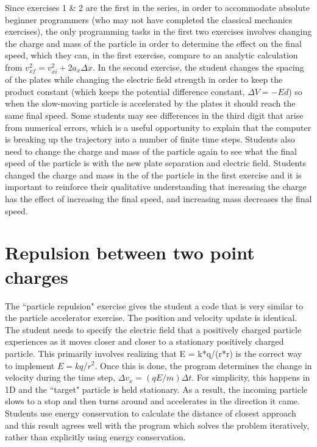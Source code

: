 \documentclass[aps,prd,10pt,twocolumn,showpacs,preprintnumbers,amsmath,amssymb,nofootinbib,floatfix]{revtex4-1}
\begin{document}
Since exercises 1 \& 2 are the first in the series, in order to accommodate absolute beginner programmers (who may not have completed the classical mechanics exercises), the only programming tasks in the first two exercises involves changing the charge and mass of the particle in order to determine the effect on the final speed, which they can, in the first exercise, compare to an analytic calculation from $v_{xf}^2 = v_{xi}^2 + 2 a_x \Delta x$. In the second exercise, the student changes the spacing of the plates while changing the electric field strength in order to keep the product constant (which keeps the potential difference constant, $\Delta V = - E d$) so when the slow-moving particle is accelerated by the plates it should reach the same final speed. Some students may see differences in the third digit that arise from numerical errors, which is a useful opportunity to explain that the computer is breaking up the trajectory into a number of finite time steps. Students also need to change the charge and mass of the particle again to see what the final speed of the particle is with the new plate separation and electric field. Students changed the charge and mass in the of the particle in the first exercise and it is important to reinforce their qualitative understanding that increasing the charge has the effect of increasing the final speed, and increasing mass decreases the final speed.




\section{Repulsion between two point charges}



The ``particle repulsion" exercise gives the student a code that is very similar to the particle accelerator exercise. The position and velocity update is identical. The student needs to specify the electric field that a positively charged particle experiences as it moves closer and closer to a stationary positively charged particle. This primarily involves realizing that E = k*q/(r*r) is the correct way to implement $E = k q/r^2$. Once this is done, the program determines the change in velocity during the time step, $\Delta v_x = (q E /m) \Delta t$. For simplicity, this happens in 1D and the ``target" particle is held stationary. As a result, the incoming particle slows to a stop and then turns around and accelerates in the direction it came. Students use energy conservation to calculate the distance of closest approach and this result agrees well with the program which solves the problem iteratively, rather than explicitly using energy conservation.
\end{document}
